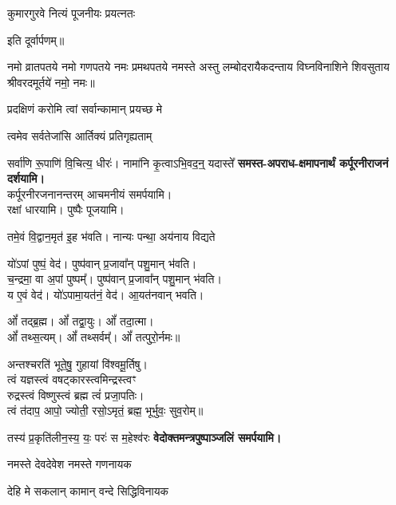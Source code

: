 \begin{center}
{कुमारगुरवे नित्यं पूजनीयः प्रयत्नतः}

इति दूर्वार्पणम्॥

नमो व्रातपतये नमो गणपतये नमः प्रमथपतये नमस्ते अस्तु लम्बोदरायैकदन्ताय विघ्नविनाशिने शिवसुताय श्रीवरदमू‍र्तये॑ नमो॒ नमः॥

{प्रदक्षिणं करोमि त्वां सर्वान्कामान् प्रयच्छ मे}

{त्वमेव सर्वतेजांसि आर्तिक्यं प्रतिगृह्यताम्}

{सर्वा॑णि रू॒पाणि॑ वि॒चित्य॒ धीरः॑। नामा॑नि कृ॒त्वाऽभि॒वद॒न्॒ यदास्ते᳚}
\textbf{\devAya{} समस्त-अपराध-क्षमापनार्थं कर्पूरनीराजनं दर्शयामि।\\}
कर्पूरनीरजनानन्तरम् आचमनीयं समर्पयामि।\\
रक्षां धारयामि। पुष्पैः पूजयामि।
\medskip

{तमे॒वं वि॒द्वान॒मृत॑ इ॒ह भ॑वति। नान्यः पन्था॒ अय॑नाय विद्यते}

यो॑ऽपां पुष्पं॒ वेद॑। पुष्प॑वान् प्र॒जावा᳚न् पशु॒मान् भ॑वति।\\
च॒न्द्रमा॒ वा अ॒पां पुष्पम्᳚। पुष्प॑वान् प्र॒जावा᳚न् पशु॒मान् भ॑वति।\\
य ए॒वं वेद॑। यो॑ऽपामा॒यत॑नं॒ वेद॑। आ॒यत॑नवान् भवति।\medskip

ओं᳚ तद्ब्र॒ह्म। ओं᳚ तद्वा॒युः। ओं᳚ तदा॒त्मा।\\
ओं᳚ तथ्स॒त्यम्‌। ओं᳚ तथ्सर्वम्᳚‌। ओं᳚ तत्पुरो॒र्नमः॥\medskip

अन्तश्चरति॑ भूते॒षु॒ गुहायां वि॑श्वमू॒र्तिषु।\\
त्वं यज्ञस्त्वं वषट्कारस्त्वमिन्द्रस्त्वꣳ\\
रुद्रस्त्वं विष्णुस्त्वं ब्रह्म त्वं॑ प्रजा॒पतिः।\\
त्वं त॑दाप॒ आपो॒ ज्योती॒ रसो॒ऽमृतं॒ ब्रह्म॒ भूर्भुवः॒ सुव॒रोम्‌॥\medskip

{तस्य॑ प्र॒कृति॑लीन॒स्य॒ यः॒ परः॑ स म॒हेश्व॑रः}
\textbf{\devAya{} वेदोक्तमन्त्रपुष्पाञ्जलिं समर्पयामि।}
\medskip

{नमस्ते देवदेवेश नमस्ते गणनायक}

{देहि मे सकलान् कामान् वन्दे सिद्धिविनायक}


\end{center}
